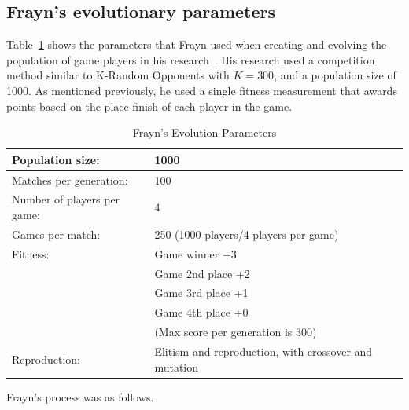 \subsection{Frayn's evolutionary parameters}

Table~\ref{table-fraynparams} shows the parameters that Frayn used when creating
and evolving the population of game players in his
research~\cite{DBLP:conf/cig/Frayn05}. His research used a competition method
similar to K-Random Opponents with \(K=300\), and a population size of 1000. As
mentioned previously, he used a single fitness measurement that awards points
based on the place-finish of each player in the game.

\begin{table}[ht]
\caption{Frayn's Evolution Parameters}
\begin{center}
\begin{tabular}{ | l | l | }
  \hline                        
  Population size: & 1000 \\ \hline
  Matches per generation: & 100 \\ \hline
  Number of players per game: & 4 \\ \hline
  Games per match: & 250 (1000 players/4 players per game) \\ \hline
  Fitness: & Game winner	+3 \\
  & Game 2nd place	+2 \\
  & Game 3rd place	+1 \\
  & Game 4th place	+0 \\
  & (Max score per generation is 300) \\ \hline
  Reproduction: & Elitism and reproduction, with crossover and mutation \\ \hline  
\end{tabular}
\label{table-fraynparams}
\end{center}
\end{table}

Frayn's process was as follows. 

